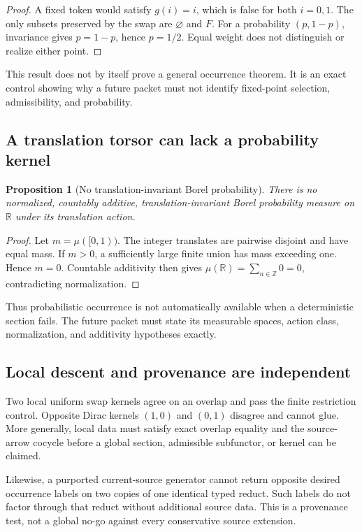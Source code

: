 \documentclass[11pt]{article}
\newtheorem{proposition}{Proposition}
\begin{document}
\begin{proof}
A fixed token would satisfy $g(i)=i$, which is false for both $i=0,1$.
The only subsets preserved by the swap are $\varnothing$ and $F$.  For a
probability $(p,1-p)$, invariance gives $p=1-p$, hence $p=1/2$.  Equal weight
does not distinguish or realize either point.
\end{proof}

This result does not by itself prove a general occurrence theorem.  It is an
exact control showing why a future packet must not identify fixed-point
selection, admissibility, and probability.

\subsection{A translation torsor can lack a probability kernel}

\begin{proposition}[No translation-invariant Borel probability]
There is no normalized, countably additive, translation-invariant Borel
probability measure on $\mathbb R$ under its translation action.
\end{proposition}

\begin{proof}
Let $m=\mu([0,1))$.  The integer translates are pairwise disjoint and have
equal mass.  If $m>0$, a sufficiently large finite union has mass exceeding
one.  Hence $m=0$.  Countable additivity then gives
$\mu(\mathbb R)=\sum_{n\in\mathbb Z}0=0$, contradicting normalization.
\end{proof}

Thus probabilistic occurrence is not automatically available when a
deterministic section fails.  The future packet must state its measurable
spaces, action class, normalization, and additivity hypotheses exactly.

\subsection{Local descent and provenance are independent}

Two local uniform swap kernels agree on an overlap and pass the finite
restriction control.  Opposite Dirac kernels $(1,0)$ and $(0,1)$ disagree and
cannot glue.  More generally, local data must satisfy exact overlap equality
and the source-arrow cocycle before a global section, admissible subfunctor, or
kernel can be claimed.

Likewise, a purported current-source generator cannot return opposite desired
occurrence labels on two copies of one identical typed reduct.  Such labels do
not factor through that reduct without additional source data.  This is a
provenance test, not a global no-go against every conservative source
extension.
\end{document}
